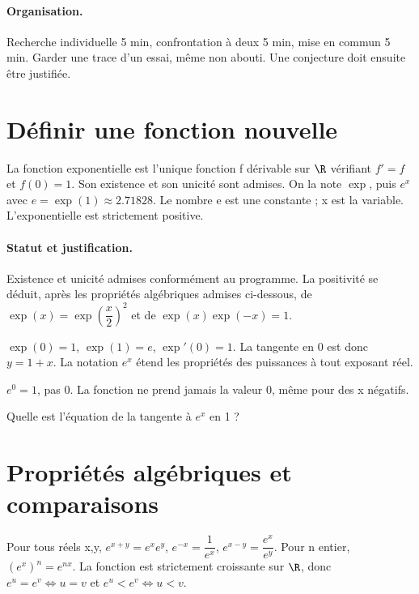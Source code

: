\paragraph{Organisation.} Recherche individuelle 5 min, confrontation à deux 5 min, mise en commun 5 min. Garder une trace d’un essai, même non abouti. Une conjecture doit ensuite être justifiée.
\mxnewpage
\section{Définir une fonction nouvelle}\label{C09-U1}
\begin{keypoint}
La fonction exponentielle est l’unique fonction f dérivable sur $\R$ vérifiant $f\prime=f$ et $f(0)=1$. Son existence et son unicité sont admises. On la note $\exp$, puis $e^x$ avec $e=\exp(1)\approx\num{2,71828}$. Le nombre e est une constante ; x est la variable. L’exponentielle est strictement positive.
\end{keypoint}
\paragraph{Statut et justification.} Existence et unicité admises conformément au programme. La positivité se déduit, après les propriétés algébriques admises ci-dessous, de $\exp (x)=\exp (\dfrac{x}{2})^2$ et de $\exp(x)\exp(-x)=1$.
\begin{example}$\exp(0)=1$, $\exp(1)=e$, $\exp\prime(0)=1$. La tangente en 0 est donc $y=1+x$. La notation $e^x$ étend les propriétés des puissances à tout exposant réel.\end{example}\label{C09-EX1}
\begin{pitfall}$e^0=1$, pas 0. La fonction ne prend jamais la valeur 0, même pour des x négatifs.\end{pitfall}
\begin{application}Quelle est l’équation de la tangente à $e^x$ en 1 ?\end{application}\label{C09-AP1}
\section{Propriétés algébriques et comparaisons}\label{C09-U2}
\begin{keypoint}
Pour tous réels x,y, $e^{x+y}=e^xe^y$, $e^{-x}=\dfrac{1}{e^x}$, $e^{x-y}=\dfrac{e^x}{e^y}$. Pour n entier, $(e^x)^n=e^{nx}$. La fonction est strictement croissante sur $\R$, donc $e^u=e^v\iff u=v$ et $e^u<e^v\iff u<v$.
\end{keypoint}
